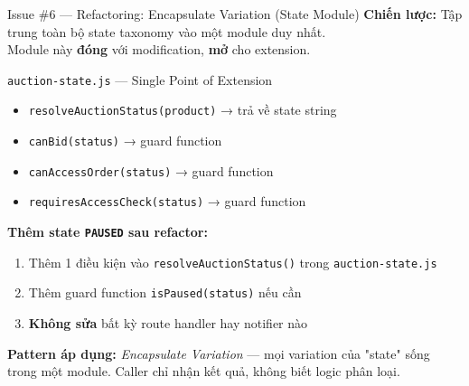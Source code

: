 \documentclass[12pt]{beamer}
\begin{document}
\begin{frame}{Issue \#6 — Refactoring: Encapsulate Variation (State Module)}
  \textbf{Chiến lược:} Tập trung toàn bộ state taxonomy vào một module duy nhất.\\
  Module này \textbf{đóng} với modification, \textbf{mở} cho extension.

  \bigskip
  \begin{block}{\texttt{auction-state.js} — Single Point of Extension}
    \begin{itemize}
      \item \texttt{resolveAuctionStatus(product)} → trả về state string
      \item \texttt{canBid(status)} → guard function
      \item \texttt{canAccessOrder(status)} → guard function
      \item \texttt{requiresAccessCheck(status)} → guard function
    \end{itemize}
  \end{block}

  \bigskip
  \textbf{Thêm state \texttt{PAUSED} sau refactor:}
  \begin{enumerate}
    \item Thêm 1 điều kiện vào \texttt{resolveAuctionStatus()} trong \texttt{auction-state.js}
    \item Thêm guard function \texttt{isPaused(status)} nếu cần
    \item \textbf{Không sửa} bất kỳ route handler hay notifier nào
  \end{enumerate}

  \bigskip
  \textbf{Pattern áp dụng:} \emph{Encapsulate Variation} — mọi variation của "state" sống trong một module. Caller chỉ nhận kết quả, không biết logic phân loại.
\end{frame}
\end{document}
